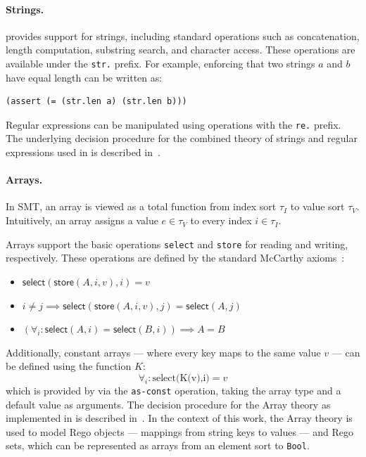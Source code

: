 \paragraph{Strings.}
\ziii provides support for strings, including standard operations such as
concatenation, length computation, substring search, and character access.
These operations are available under the \texttt{str.} prefix.
For example, enforcing that two strings $a$ and $b$ have equal length can be written as:
\begin{lstlisting}[language=SMT]
(assert (= (str.len a) (str.len b)))
\end{lstlisting}
Regular expressions can be manipulated using operations with the \texttt{re.} prefix.
The underlying decision procedure for the combined theory of strings and regular expressions used in \ziii is described in~\cite{smt:strings}.

\paragraph{Arrays.}
In SMT, an array is viewed as a total function from index sort $\tau_I$ to value sort $\tau_V$.
Intuitively, an array assigns a value $e \in \tau_V$ to every index $i \in \tau_I$.

Arrays support the basic operations \texttt{select} and \texttt{store} for reading and writing, respectively.
These operations are defined by the standard McCarthy axioms~\cite{mccarthy:arrays}:
\begin{itemize}
  \item $\mathsf{select}(\mathsf{store}(A,i,v),i) = v$
  \item $i \neq j \implies \mathsf{select}(\mathsf{store}(A,i,v),j) = \mathsf{select}(A,j)$
  \item $(\forall_i: \mathsf{select}(A,i) = \mathsf{select}(B,i)) \implies A = B$
\end{itemize}
Additionally, constant arrays — where every key maps to the same value $v$ — can be
defined using the function $K$:
$$\forall_i: \text{select(K(v),i)} = v$$
which is provided by \ziii via the \texttt{as-const} operation, taking the array
type and a default value as arguments.
The decision procedure for the Array theory as implemented in \ziii is described
in~\cite{z3:array-theory}.
In the context of this work, the Array theory is used to model Rego objects —
mappings from string keys to values — and Rego sets, which can be represented as
arrays from an element sort to \texttt{Bool}.

